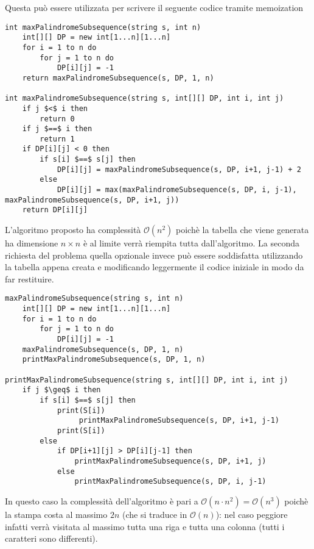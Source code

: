 \documentclass[../cheatSheetAlgoritmi.tex]{subfiles}
\begin{document}
Questa può essere utilizzata per scrivere il seguente codice tramite memoization
\begin{lstlisting}[caption=Sottostringa Palindroma Massimale]
int maxPalindromeSubsequence(string s, int n)
	int[][] DP = new int[1...n][1...n]
	for i = 1 to n do
		for j = 1 to n do
			DP[i][j] = -1
	return maxPalindromeSubsequence(s, DP, 1, n)
	
int maxPalindromeSubsequence(string s, int[][] DP, int i, int j)
	if j $<$ i then
		return 0
	if j $==$ i then
		return 1
	if DP[i][j] < 0 then
		if s[i] $==$ s[j] then
			DP[i][j] = maxPalindromeSubsequence(s, DP, i+1, j-1) + 2
		else 
			DP[i][j] = max(maxPalindromeSubsequence(s, DP, i, j-1), maxPalindromeSubsequence(s, DP, i+1, j)) 
	return DP[i][j]
\end{lstlisting}
L'algoritmo proposto ha complessità $\mathcal{O}(n^{2})$ poichè la tabella che viene generata ha dimensione $n \times n$ è al limite verrà riempita tutta dall'algoritmo. La seconda richiesta del problema quella opzionale invece può essere soddisfatta utilizzando la tabella appena creata e modificando leggermente il codice iniziale in modo da far restituire.
\begin{lstlisting}[caption=Stampa Sottostringa Palindroma Massimale]
maxPalindromeSubsequence(string s, int n)
	int[][] DP = new int[1...n][1...n]
	for i = 1 to n do
		for j = 1 to n do
			DP[i][j] = -1
	maxPalindromeSubsequence(s, DP, 1, n)
	printMaxPalindromeSubsequence(s, DP, 1, n)
	
printMaxPalindromeSubsequence(string s, int[][] DP, int i, int j)
	if j $\geq$ i then 
		if s[i] $==$ s[j] then
			print(S[i])
				 printMaxPalindromeSubsequence(s, DP, i+1, j-1)
			print(S[i])
		else 
			if DP[i+1][j] > DP[i][j-1] then
				printMaxPalindromeSubsequence(s, DP, i+1, j)
			else
				printMaxPalindromeSubsequence(s, DP, i, j-1)
\end{lstlisting}
In questo caso la complessità dell'algoritmo è pari a $\mathcal{O}(n \cdot n^{2}) = \mathcal{O}(n^{3})$ poichè la stampa costa al massimo $2n$ (che si traduce in $\mathcal{O}(n)$): nel caso peggiore infatti verrà visitata al massimo tutta una riga e tutta una colonna (tutti i caratteri sono differenti).
\newpage
\end{document}
